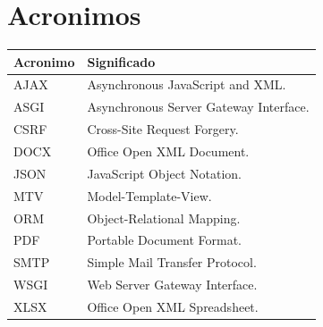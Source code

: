 \chapter*{Acronimos}

\begin{longtable}{p{2.8cm}p{9.5cm}}
\toprule
Acronimo & Significado \\
\midrule
AJAX & Asynchronous JavaScript and XML. \\
ASGI & Asynchronous Server Gateway Interface. \\
CSRF & Cross-Site Request Forgery. \\
DOCX & Office Open XML Document. \\
JSON & JavaScript Object Notation. \\
MTV & Model-Template-View. \\
ORM & Object-Relational Mapping. \\
PDF & Portable Document Format. \\
SMTP & Simple Mail Transfer Protocol. \\
WSGI & Web Server Gateway Interface. \\
XLSX & Office Open XML Spreadsheet. \\
\bottomrule
\end{longtable}

\cleardoublepage
